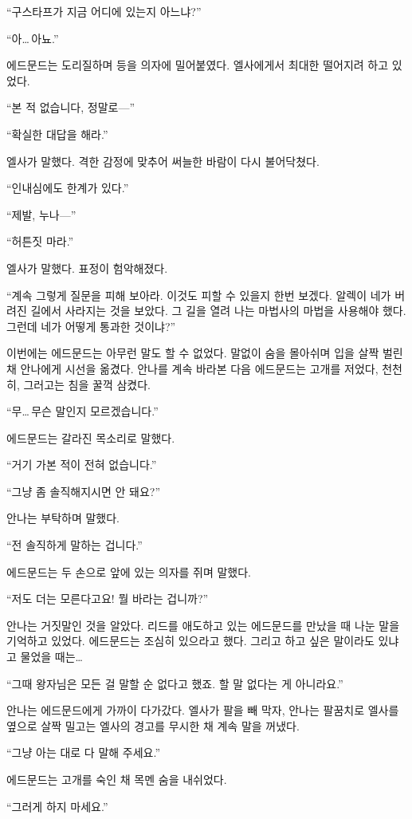 ``구스타프가 지금 어디에 있는지 아느냐?''

``아\ldots\,아뇨.''

에드문드는 도리질하며 등을 의자에 밀어붙였다. 엘사에게서 최대한 떨어지려 하고 있었다.

``본 적 없습니다, 정말로—''

``확실한 대답을 해라.''

엘사가 말했다. 격한 감정에 맞추어 써늘한 바람이 다시 불어닥쳤다.

``인내심에도 한계가 있다.''

``제발, 누나—''

``허튼짓 마라.''

엘사가 말했다. 표정이 험악해졌다.

``계속 그렇게 질문을 피해 보아라. 이것도 피할 수 있을지 한번 보겠다. 알렉이 네가 버려진 길에서 사라지는 것을 보았다. 그 길을 열려 나는 마법사의 마법을 사용해야 했다. 그런데 네가 어떻게 통과한 것이냐?''

이번에는 에드문드는 아무런 말도 할 수 없었다. 말없이 숨을 몰아쉬며 입을 살짝 벌린 채 안나에게 시선을 옮겼다. 안나를 계속 바라본 다음 에드문드는 고개를 저었다, 천천히, 그러고는 침을 꿀꺽 삼켰다.

``무\ldots\,무슨 말인지 모르겠습니다.''

에드문드는 갈라진 목소리로 말했다.

``거기 가본 적이 전혀 없습니다.''

``그냥 좀 솔직해지시면 안 돼요?''

안나는 부탁하며 말했다.

``전 솔직하게 말하는 겁니다.''

에드문드는 두 손으로 앞에 있는 의자를 쥐며 말했다.

``저도 더는 모른다고요! 뭘 바라는 겁니까?''

안나는 거짓말인 것을 알았다. 리드를 애도하고 있는 에드문드를 만났을 때 나눈 말을 기억하고 있었다. 에드문드는 조심히 있으라고 했다. 그리고 하고 싶은 말이라도 있냐고 물었을 때는\ldots

``그때 왕자님은 모든 걸 말할 순 없다고 했죠. 할 말 없다는 게 아니라요.''

안나는 에드문드에게 가까이 다가갔다. 엘사가 팔을 빼 막자, 안나는 팔꿈치로 엘사를 옆으로 살짝 밀고는 엘사의 경고를 무시한 채 계속 말을 꺼냈다.

``그냥 아는 대로 다 말해 주세요.''

에드문드는 고개를 숙인 채 목멘 숨을 내쉬었다.

``그러게 하지 마세요.''


